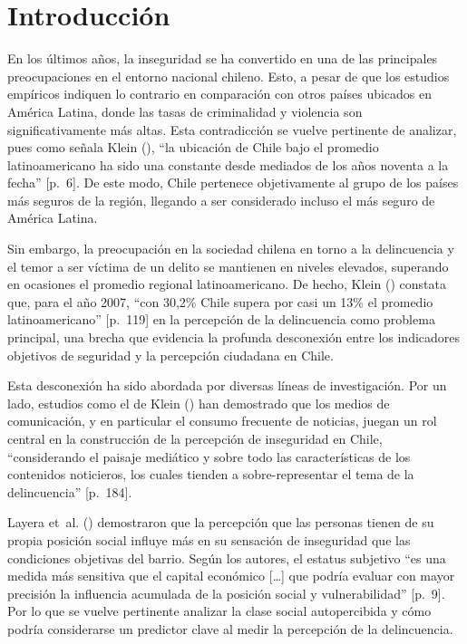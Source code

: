 \documentclass[
  spanish,
  a4paper,
  oneside]{scrbook}
\begin{document}

\chapter{Introducción}\label{introducciuxf3n-1}

En los últimos años, la inseguridad se ha convertido en una de las
principales preocupaciones en el entorno nacional chileno. Esto, a pesar
de que los estudios empíricos indiquen lo contrario en comparación con
otros países ubicados en América Latina, donde las tasas de criminalidad
y violencia son significativamente más altas. Esta contradicción se
vuelve pertinente de analizar, pues como señala Klein
(), ``la ubicación de
Chile bajo el promedio latinoamericano ha sido una constante desde
mediados de los años noventa a la fecha'' {[}p.~6{]}. De este modo,
Chile pertenece objetivamente al grupo de los países más seguros de la
región, llegando a ser considerado incluso el más seguro de América
Latina.

Sin embargo, la preocupación en la sociedad chilena en torno a la
delincuencia y el temor a ser víctima de un delito se mantienen en
niveles elevados, superando en ocasiones el promedio regional
latinoamericano. De hecho, Klein
() constata que, para el
año 2007, ``con 30,2\% Chile supera por casi un 13\% el promedio
latinoamericano'' {[}p.~119{]} en la percepción de la delincuencia como
problema principal, una brecha que evidencia la profunda desconexión
entre los indicadores objetivos de seguridad y la percepción ciudadana
en Chile.

Esta desconexión ha sido abordada por diversas líneas de investigación.
Por un lado, estudios como el de Klein
() han demostrado que los
medios de comunicación, y en particular el consumo frecuente de
noticias, juegan un rol central en la construcción de la percepción de
inseguridad en Chile, ``considerando el paisaje mediático y sobre todo
las características de los contenidos noticieros, los cuales tienden a
sobre-representar el tema de la delincuencia'' {[}p.~184{]}.

Layera et~al.
() demostraron
que la percepción que las personas tienen de su propia posición social
influye más en su sensación de inseguridad que las condiciones objetivas
del barrio. Según los autores, el estatus subjetivo ``es una medida más
sensitiva que el capital económico {[}\ldots{]} que podría evaluar con
mayor precisión la influencia acumulada de la posición social y
vulnerabilidad'' {[}p.~9{]}. Por lo que se vuelve pertinente analizar la
clase social autopercibida y cómo podría considerarse un predictor clave
al medir la percepción de la delincuencia.
\end{document}
